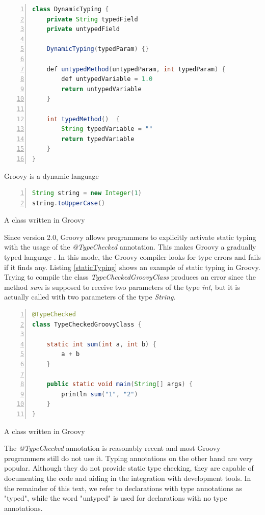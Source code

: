 \documentclass[preprint]{sigplanconf}
\begin{document}
\begin{Listing}[ht]
\begin{lstlisting}[language=Java,tabsize=2,breaklines=true,numbers=left]
class DynamicTyping {
	private String typedField
	private untypedField

	DynamicTyping(typedParam) {}

	def untypedMethod(untypedParam, int typedParam) {
		def untypedVariable = 1.0
		return untypedVariable
	}

	int typedMethod()  {
		String typedVariable = ""
		return typedVariable
	}
}
\end{lstlisting}
\caption{Groovy is a dynamic language}
\label{dynamicTyping}
\end{Listing}

\begin{Listing}[ht]
\begin{lstlisting}[language=Java,tabsize=2,breaklines=true,numbers=left]
String string = new Integer(1)
string.toUpperCase()
\end{lstlisting}
\caption{A class written in Groovy}
\label{typeError}
\end{Listing}

Since version 2.0, Groovy allows programmers to explicitly activate static typing with the usage of the \emph{@TypeChecked} annotation.
This makes Groovy a gradually typed language \cite{gray05,gray08,gray11,siek07,takikawa12}.
In this mode, the Groovy compiler looks for type errors and fails if it finds any.
Listing \ref{staticTyping} shows an example of static typing in Groovy.
Trying to compile the class \emph{TypeCheckedGroovyClass} produces an error since the method \emph{sum} is supposed to receive two parameters of the type \emph{int}, but it is actually called with two parameters of the type \emph{String}.

\begin{Listing}[ht]
\begin{lstlisting}[language=Java,tabsize=2,breaklines=true,numbers=left]
@TypeChecked
class TypeCheckedGroovyClass {
	
	static int sum(int a, int b) {
		a + b
	}

	public static void main(String[] args) {
		println sum("1", "2")
	}
}
\end{lstlisting}
\caption{A class written in Groovy}
\label{staticTyping}
\end{Listing}

The \emph{@TypeChecked} annotation is reasonably recent and most Groovy programmers still do not use it. 
Typing annotations on the other hand are very popular.
Although they do not provide static type checking, they are capable of documenting the code and aiding in the integration with development tools.
In the remainder of this text, we refer to declarations with type annotations as "typed", while the word "untyped" is used for declarations with no type annotations.
\end{document}
